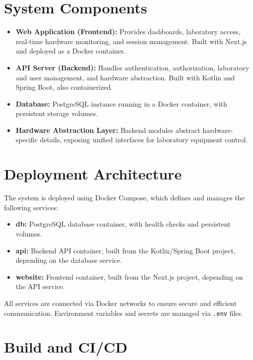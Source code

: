 \section{System Components}

\begin{itemize}
    \item \textbf{Web Application (Frontend):} Provides dashboards, laboratory access, real-time hardware monitoring, and session management. Built with Next.js and deployed as a Docker container.
    \item \textbf{API Server (Backend):} Handles authentication, authorization, laboratory and user management, and hardware abstraction. Built with Kotlin and Spring Boot, also containerized.
    \item \textbf{Database:} PostgreSQL instance running in a Docker container, with persistent storage volumes.
    \item \textbf{Hardware Abstraction Layer:} Backend modules abstract hardware-specific details, exposing unified interfaces for laboratory equipment control.
\end{itemize}

\section{Deployment Architecture}

The system is deployed using Docker Compose, which defines and manages the following services:

\begin{itemize}
    \item \textbf{db:} PostgreSQL database container, with health checks and persistent volumes.
    \item \textbf{api:} Backend API container, built from the Kotlin/Spring Boot project, depending on the database service.
    \item \textbf{website:} Frontend container, built from the Next.js project, depending on the API service.
\end{itemize}

All services are connected via Docker networks to ensure secure and efficient communication. Environment variables and secrets are managed via \texttt{.env} files.

\section{Build and CI/CD}

